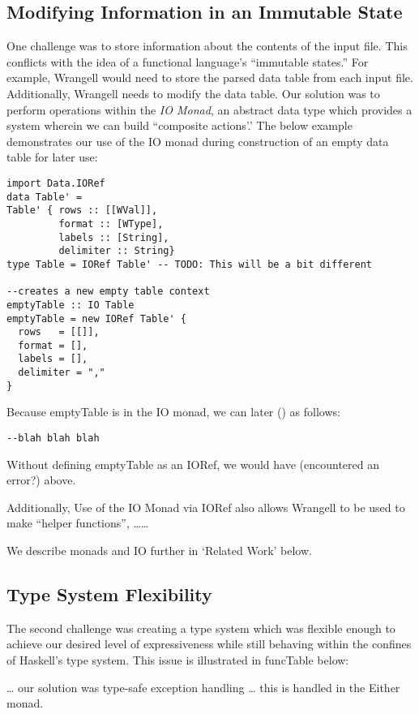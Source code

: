 \documentclass[preprint,nocopyrightspace]{sig-alternate}
\begin{document}
\subsection{Modifying Information in an Immutable State}
One challenge was to store information about the contents of the input file. This conflicts with the idea of a functional language’s “immutable states.” For example, Wrangell would need to store the parsed data table from each input file. Additionally, Wrangell needs to modify the data table. Our solution was to perform operations within the \emph{IO Monad}, an abstract data type which provides a system wherein we can build ``composite actions’.’ 
The below example demonstrates our use of the IO monad during construction of an empty data table for later use: 
\begin{lstlisting}
import Data.IORef
data Table' = 
Table' { rows :: [[WVal]], 
         format :: [WType], 
         labels :: [String], 
         delimiter :: String}
type Table = IORef Table' -- TODO: This will be a bit different

--creates a new empty table context
emptyTable :: IO Table
emptyTable = new IORef Table' {    
  rows   = [[]],
  format = [],
  labels = [],
  delimiter = ","
}
\end{lstlisting}

Because emptyTable is in the IO monad, we can later () as follows:
\begin{lstlisting}
--blah blah blah
\end{lstlisting}

Without defining emptyTable as an IORef, we would have (encountered an error?) above. 

Additionally, Use of the IO Monad via IORef also allows Wrangell to be used to make “helper functions”, ……

We describe monads and IO further in ‘Related Work’ below. 

\subsection{Type System Flexibility}
The second challenge was creating a type system which was flexible enough to achieve our desired level of expressiveness while still behaving within the confines of Haskell’s type system. This issue is illustrated in funcTable below:




… our solution was type-safe exception handling … this is handled in the Either monad. 
\end{document}
